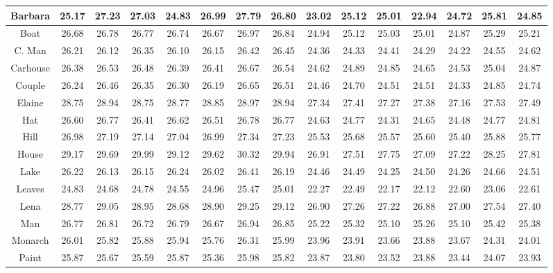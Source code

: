 \documentclass[10pt,twocolumn,letterpaper]{article}
\begin{document}
\begin{table*}[t]
\begin{center}
\begin{tabular}{|c||c|c|c|c|c|c|c||c|c|c|c|c|c|c|}
\\
\hline
 Barbara &25.17 & 27.23  & 27.03  & 24.83  & 26.99 &  27.79& 26.80     &23.02& 25.12  & 25.01  & 22.94   &  24.72& 25.81 &  24.85   
\\
\hline
  Boat & 26.68& 26.78 & 26.77  & 26.74  & 26.67 & 26.97  &  26.84    & 24.94 & 25.12 & 25.03 & 25.01 &  24.87&  25.29  &  25.21         
\\
\hline
 C. Man  & 26.21 & 26.12 & 26.35   & 26.10 & 26.15 & 26.42 & 26.45   &24.36& 24.33 & 24.41 &  24.29  & 24.22 &  24.55 &  24.62     
\\
\hline
 Carhouse &26.38 & 26.53 & 26.48  &  26.39   & 26.41 & 26.67 &26.54    &24.62 &  24.89 & 24.85  &  24.65  & 24.53  &25.04 &24.87
\\
\hline
 Couple &26.24 & 26.46 & 26.35  & 26.30 & 26.19 &  26.65 & 26.51   &24.46& 24.70 & 24.51 & 24.51 & 24.33 & 24.85  &  24.74   
\\
\hline
 Elaine &28.75 &  28.94 & 28.75 & 28.77   & 28.85 & 28.97 &28.94     &27.34&   27.41  & 27.27 & 27.38  &  27.16 &27.53&27.49   
\\
\hline
 Hat & 26.60 &  26.77 & 26.41 & 26.62  & 26.51 & 26.78 &26.77     &24.63 &   24.77  & 24.31  & 24.65   &  24.48 &24.77 & 24.81
\\
\hline
 Hill  & 26.98  & 27.19 & 27.14  & 27.04 & 26.99   &27.34 &27.23     &25.53& 25.68 & 25.57 & 25.60 &  25.40 & 25.88  & 25.77           
\\
\hline
 House & 29.17 & 29.69 & 29.99  & 29.12  & 29.62  & 30.32 &29.94      &26.91& 27.51 & 27.75  &  27.09 &  27.22 & 28.25 & 27.81    
\\
\hline
 Lake & 26.22  &  26.13  & 26.15  & 26.24  &  26.02  & 26.41&26.19      &24.46 & 24.49 & 24.25 & 24.50 & 24.26 &24.66 &24.51   
\\
\hline
 Leaves &24.83  & 24.68 & 24.78   & 24.55  & 24.96 & 25.47 &25.01     &22.27 & 22.49  & 22.17 & 22.12 &  22.60 & 23.06 & 22.61
\\
\hline
 Lena &28.77 & 29.05 & 28.95 & 28.68 & 28.90 &  29.25  & 29.12     &26.90 & 27.26 & 27.22 &  26.88 & 27.00 & 27.54 &  27.40   
\\
\hline
 Man  &26.77 & 26.81 & 26.72    & 26.79 & 26.67 &  26.94 &  26.85    &25.22& 25.32 & 25.10  & 25.26  & 25.10 &  25.42& 25.38      
\\
\hline
 Monarch &26.01 & 25.82 & 25.88 & 25.94 & 25.76 & 26.31 & 25.99    &23.96& 23.91 & 23.66  &  23.88   &  23.67& 24.31 & 24.01   
\\
\hline
 Paint &25.87 & 25.67 & 25.59 & 25.87 & 25.36 &25.98 & 25.82      &23.87 &  23.80 & 23.52 &  23.88 & 23.44 &24.07 & 23.93  

\end{tabular}
\end{center}
\end{table*}
\end{document}
